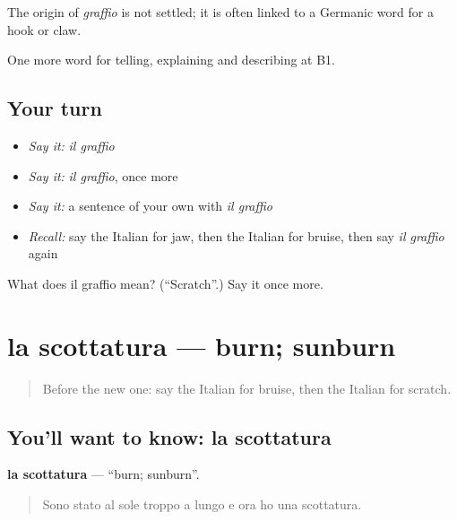 \begin{cousinweb}
The origin of \emph{graffio} is not settled; it is often linked to a Germanic word for a hook or claw.
\end{cousinweb}

\begin{grammarlens}[title={What you've built}]
One more word for telling, explaining and describing at B1.
\end{grammarlens}

\subsection*{Your turn}
\begin{itemize}
\raggedright
  \item \emph{Say it:} \emph{il graffio}
  \item \emph{Say it:} \emph{il graffio}, once more
  \item \emph{Say it:} a sentence of your own with \emph{il graffio}
  \item \emph{Recall:} say the Italian for jaw, then the Italian for bruise, then say \emph{il graffio} again
\end{itemize}

\begin{tcolorbox}[breakable,colback=teal!4,colframe=teal!35!black,title={Before you move on}]
What does il graffio mean? (\textquotedblleft{}Scratch\textquotedblright{}.) Say it once more.
\end{tcolorbox}
\section[la scottatura]{la scottatura — burn; sunburn}

\label{lesson:IT-C483-scottatura}



\begin{quote}
Before the new one: say the Italian for bruise, then the Italian for scratch.
\end{quote}

\subsection*{You'll want to know: la scottatura}
\textbf{la scottatura} — \textquotedblleft{}burn; sunburn\textquotedblright{}.

\begin{quote}
Sono stato al sole troppo a lungo e ora ho una scottatura.
\end{quote}

